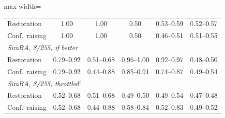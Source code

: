 \begin{table}[!tbp]
\begin{adjustbox}{max width=\textwidth}
\begin{tabular}{lccccc}
\quad Restoration & 1.00 & 1.00 & 0.50 & 0.53--0.59 & 0.52--0.57 \\
\quad Conf.\ raising & 1.00 & 1.00 & 0.50 & 0.46--0.51 & 0.51--0.55 \\[2pt]
\multicolumn{6}{l}{\emph{SimBA, 8/255, if better}} \\
\quad Restoration & 0.79--0.92 & 0.51--0.68 & 0.96--1.00 & 0.92--0.97 & 0.48--0.50 \\
\quad Conf.\ raising & 0.79--0.92 & 0.44--0.88 & 0.85--0.91 & 0.74--0.87 & 0.49--0.54 \\[2pt]
\multicolumn{6}{l}{\emph{SimBA, 8/255, throttled$^{\ddagger}$}} \\
\quad Restoration & 0.52--0.68 & 0.51--0.68 & 0.49--0.50 & 0.49--0.54 & 0.47--0.48 \\
\quad Conf.\ raising & 0.52--0.68 & 0.44--0.88 & 0.58--0.84 & 0.52--0.83 & 0.49--0.52 \\
\bottomrule
\end{tabular}
\end{adjustbox}
\end{table}
